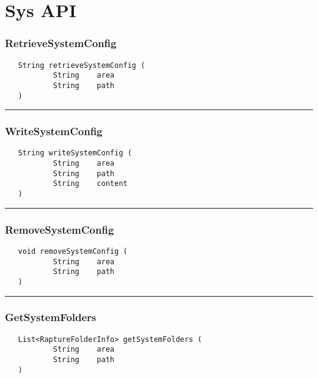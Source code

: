 \chapter{Sys API}

\subsection{RetrieveSystemConfig}
\label{Api:RetrieveSystemConfig}
\begin{verbatim}
   String retrieveSystemConfig (
           String    area
           String    path
   )
\end{verbatim}



\rule{15cm}{2pt}
\subsection{WriteSystemConfig}
\label{Api:WriteSystemConfig}
\begin{verbatim}
   String writeSystemConfig (
           String    area
           String    path
           String    content
   )
\end{verbatim}



\rule{15cm}{2pt}
\subsection{RemoveSystemConfig}
\label{Api:RemoveSystemConfig}
\begin{verbatim}
   void removeSystemConfig (
           String    area
           String    path
   )
\end{verbatim}



\rule{15cm}{2pt}
\subsection{GetSystemFolders}
\label{Api:GetSystemFolders}
\begin{verbatim}
   List<RaptureFolderInfo> getSystemFolders (
           String    area
           String    path
   )
\end{verbatim}




